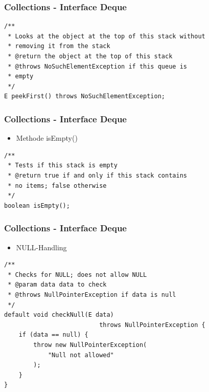 \documentclass{beamer}
\begin{document}
\begin{frame}[fragile]
\frametitle{Collections - Interface Deque}

\begin{lstlisting}
/**
 * Looks at the object at the top of this stack without 
 * removing it from the stack
 * @return the object at the top of this stack
 * @throws NoSuchElementException if this queue is 
 * empty
 */
E peekFirst() throws NoSuchElementException;
\end{lstlisting}

\end{frame}

\begin{frame}[fragile]
\frametitle{Collections - Interface Deque}

\begin{itemize}
\setlength{\itemsep}{8pt}
\item Methode isEmpty()
\end{itemize}

\begin{lstlisting}
/**
 * Tests if this stack is empty
 * @return true if and only if this stack contains 
 * no items; false otherwise
 */
boolean isEmpty();
\end{lstlisting}

\end{frame}

\begin{frame}[fragile]
\frametitle{Collections - Interface Deque}

\begin{itemize}
\setlength{\itemsep}{8pt}
\item NULL-Handling
\end{itemize}

\begin{lstlisting}
/**
 * Checks for NULL; does not allow NULL
 * @param data data to check
 * @throws NullPointerException if data is null
 */
default void checkNull(E data) 
                          throws NullPointerException {
    if (data == null) {
        throw new NullPointerException(
            "Null not allowed"
        );
    }
}
\end{lstlisting}

\end{frame}
\end{document}
